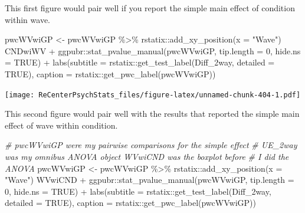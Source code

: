 \documentclass[
  11pt,
]{book}
\newenvironment{Shaded}{\begin{snugshade}}{\end{snugshade}}
\newcommand{\AttributeTok}[1]{\textcolor[rgb]{0.77,0.63,0.00}{#1}}
\newcommand{\CommentTok}[1]{\textcolor[rgb]{0.56,0.35,0.01}{\textit{#1}}}
\newcommand{\ConstantTok}[1]{\textcolor[rgb]{0.00,0.00,0.00}{#1}}
\newcommand{\DecValTok}[1]{\textcolor[rgb]{0.00,0.00,0.81}{#1}}
\newcommand{\FunctionTok}[1]{\textcolor[rgb]{0.00,0.00,0.00}{#1}}
\newcommand{\NormalTok}[1]{#1}
\newcommand{\OtherTok}[1]{\textcolor[rgb]{0.56,0.35,0.01}{#1}}
\newcommand{\SpecialCharTok}[1]{\textcolor[rgb]{0.00,0.00,0.00}{#1}}
\newcommand{\StringTok}[1]{\textcolor[rgb]{0.31,0.60,0.02}{#1}}
\begin{document}
This first figure would pair well if you report the simple main effect of condition within wave.

\begin{Shaded}
\begin{Highlighting}[]
\NormalTok{pwcWVwiGP }\OtherTok{\textless{}{-}}\NormalTok{ pwcWVwiGP }\SpecialCharTok{\%\textgreater{}\%}
\NormalTok{    rstatix}\SpecialCharTok{::}\FunctionTok{add\_xy\_position}\NormalTok{(}\AttributeTok{x =} \StringTok{"Wave"}\NormalTok{)}
\NormalTok{CNDwiWV }\SpecialCharTok{+}\NormalTok{ ggpubr}\SpecialCharTok{::}\FunctionTok{stat\_pvalue\_manual}\NormalTok{(pwcWVwiGP, }\AttributeTok{tip.length =} \DecValTok{0}\NormalTok{, }\AttributeTok{hide.ns =} \ConstantTok{TRUE}\NormalTok{) }\SpecialCharTok{+}
    \FunctionTok{labs}\NormalTok{(}\AttributeTok{subtitle =}\NormalTok{ rstatix}\SpecialCharTok{::}\FunctionTok{get\_test\_label}\NormalTok{(Diff\_2way, }\AttributeTok{detailed =} \ConstantTok{TRUE}\NormalTok{),}
        \AttributeTok{caption =}\NormalTok{ rstatix}\SpecialCharTok{::}\FunctionTok{get\_pwc\_label}\NormalTok{(pwcWVwiGP))}
\end{Highlighting}
\end{Shaded}

\texttt{[image: ReCenterPsychStats\_files/figure-latex/unnamed-chunk-404-1.pdf]}

This second figure would pair well with the results that reported the simple main effect of wave within condition.

\begin{Shaded}
\begin{Highlighting}[]
\CommentTok{\# pwcWVwiGP were my pairwise comparisons for the simple effect}
\CommentTok{\# UE\_2way was my omnibus ANOVA object WVwiCND was the boxplot before}
\CommentTok{\# I did the ANOVA}
\NormalTok{pwcWVwiGP }\OtherTok{\textless{}{-}}\NormalTok{ pwcWVwiGP }\SpecialCharTok{\%\textgreater{}\%}
\NormalTok{    rstatix}\SpecialCharTok{::}\FunctionTok{add\_xy\_position}\NormalTok{(}\AttributeTok{x =} \StringTok{"Wave"}\NormalTok{)}
\NormalTok{WVwiCND }\SpecialCharTok{+}\NormalTok{ ggpubr}\SpecialCharTok{::}\FunctionTok{stat\_pvalue\_manual}\NormalTok{(pwcWVwiGP, }\AttributeTok{tip.length =} \DecValTok{0}\NormalTok{, }\AttributeTok{hide.ns =} \ConstantTok{TRUE}\NormalTok{) }\SpecialCharTok{+}
    \FunctionTok{labs}\NormalTok{(}\AttributeTok{subtitle =}\NormalTok{ rstatix}\SpecialCharTok{::}\FunctionTok{get\_test\_label}\NormalTok{(Diff\_2way, }\AttributeTok{detailed =} \ConstantTok{TRUE}\NormalTok{),}
        \AttributeTok{caption =}\NormalTok{ rstatix}\SpecialCharTok{::}\FunctionTok{get\_pwc\_label}\NormalTok{(pwcWVwiGP))}
\end{Highlighting}
\end{Shaded}
\end{document}
